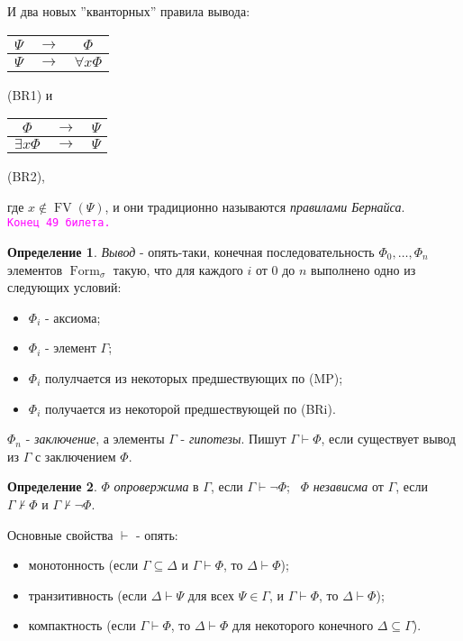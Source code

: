 \documentclass[a4paper,100pt]{article}
\theoremstyle{indented}
\theoremstyle{definition}
\newtheorem{defn}{Определение}
\theoremstyle{remark}
\DeclareMathOperator{\form}{Form}
\DeclareMathOperator{\FV}{FV}
\begin{document}
И два новых ''кванторных'' правила вывода:

\begin{center}
  \begin{tabular}{c c c}
    $\Psi$ & $\rightarrow$ & $\Phi$ \\ 
    \hline
    $\Psi$ & $\rightarrow$ & $\forall x \Phi$
  \end{tabular}
  (BR1)\: \:\: \: и \: \: \: \:
  \begin{tabular}{c c c}
    $\Phi$ & $\rightarrow$ & $\Psi$ \\ 
    \hline
    $\exists x \Phi$ & $\rightarrow$ & $\Psi$ 
  \end{tabular}
  (BR2), 
\end{center}

где $x \notin \FV(\Psi)$, и они традиционно называются \textit{правилами Бернайса}. \\

\texttt{\textcolor{magenta}{Конец 49 билета.}} 

\hrulefill

\begin{defn}
  \textit{Вывод} - опять-таки, конечная последовательность $\Phi_0, \ldots, \Phi_n$ элементов $\form_\sigma$ такую, что для каждого $i$ от 0 до $n$ выполнено одно из следующих условий:

  \begin{itemize}
    \item $\Phi_i$ - аксиома; 
    \item $\Phi_i$ - элемент $\Gamma$; 
    \item $\Phi_i$ полулчается из некоторых предшествующих по (MP);
    \item $\Phi_i$ получается из некоторой предшествующей по (BRi). 
  \end{itemize}

  $\Phi_n$ - \textit{заключение}, а элементы $\Gamma$ - \textit{гипотезы}. Пишут $\Gamma \vdash \Phi$, если существует вывод из $\Gamma$ с заключением $\Phi$. 
\end{defn}

\begin{defn}
  $\Phi$ \textit{опровержима} в $\Gamma$, если $\Gamma \vdash \neg \Phi$; \ 
  $\Phi$ \textit{независма} от $\Gamma$, если $\Gamma \nvdash \Phi$ и $\Gamma \nvdash \neg \Phi$. 
\end{defn}

Основные свойства $\vdash$ - опять:

\begin{itemize}
  \item монотонность (если $\Gamma \subseteq \Delta$ и $\Gamma \vdash \Phi$, то $\Delta \vdash \Phi$); 
  \item транзитивность (если $\Delta \vdash \Psi$ для всех $\Psi \in \Gamma$, и $\Gamma \vdash \Phi$, то $\Delta \vdash \Phi$);
  \item компактность (если $\Gamma \vdash \Phi$, то $\Delta \vdash \Phi$ для некоторого конечного $\Delta \subseteq \Gamma$).
\end{itemize}
\end{document}
